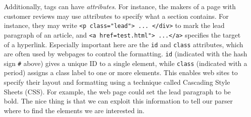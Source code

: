 

Additionally, tags can have \emph{attributes}. For instance, the
makers of a page with customer reviews may use attributes to specify
what a section contains. For instance, they may write
\verb|<p class="lead"> ... </div>| to mark the lead paragraph of an article,
and \verb|<a href=test.html"> ...</a>| specifies the target of a hyperlink.
Especially important here are the \verb|id| and \verb|class| attributes,
which are often used by webpages to control the formatting.
\verb|id| (indicated with the hash sign \verb|#| above) gives a unique ID to a single element,
while \verb|class| (indicated with a period) assigns a class label to one or more elements.
This enables web sites to specify their layout and formatting using a technique called Cascading Style Sheets (CSS).
For example, the web page could set the lead paragraph to be bold.
The nice thing is that we can exploit
this information to tell our parser where to find the elements we
are interested in.

%



